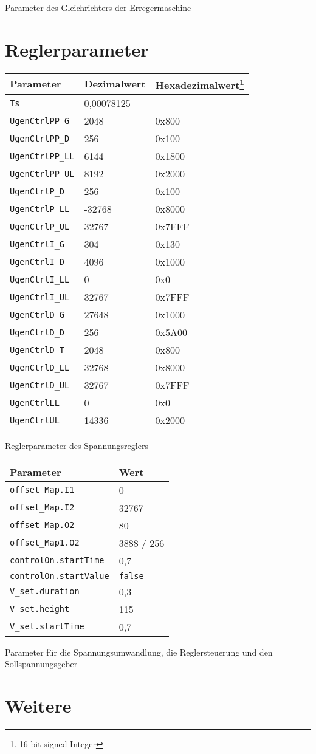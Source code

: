 Parameter des Gleichrichters der Erregermaschine

\hypertarget{reglerparameter}{%
\section{Reglerparameter}\label{reglerparameter}}

\begin{longtable}[]{@{}lll@{}}
\toprule
Parameter & Dezimalwert & Hexadezimalwert\footnote{16 bit signed Integer}\tabularnewline
\midrule
\endhead
\texttt{Ts} & 0,00078125 & -\tabularnewline
\texttt{UgenCtrlPP\_G} & 2048 & 0x800\tabularnewline
\texttt{UgenCtrlPP\_D} & 256 & 0x100\tabularnewline
\texttt{UgenCtrlPP\_LL} & 6144 & 0x1800\tabularnewline
\texttt{UgenCtrlPP\_UL} & 8192 & 0x2000\tabularnewline
\texttt{UgenCtrlP\_D} & 256 & 0x100\tabularnewline
\texttt{UgenCtrlP\_LL} & -32768 & 0x8000\tabularnewline
\texttt{UgenCtrlP\_UL} & 32767 & 0x7FFF\tabularnewline
\texttt{UgenCtrlI\_G} & 304 & 0x130\tabularnewline
\texttt{UgenCtrlI\_D} & 4096 & 0x1000\tabularnewline
\texttt{UgenCtrlI\_LL} & 0 & 0x0\tabularnewline
\texttt{UgenCtrlI\_UL} & 32767 & 0x7FFF\tabularnewline
\texttt{UgenCtrlD\_G} & 27648 & 0x1000\tabularnewline
\texttt{UgenCtrlD\_D} & 256 & 0x5A00\tabularnewline
\texttt{UgenCtrlD\_T} & 2048 & 0x800\tabularnewline
\texttt{UgenCtrlD\_LL} & 32768 & 0x8000\tabularnewline
\texttt{UgenCtrlD\_UL} & 32767 & 0x7FFF\tabularnewline
\texttt{UgenCtrlLL} & 0 & 0x0\tabularnewline
\texttt{UgenCtrlUL} & 14336 & 0x2000\tabularnewline
\bottomrule
\end{longtable}

Reglerparameter des Spannungsreglers

\begin{longtable}[]{@{}ll@{}}
\toprule
Parameter & Wert\tabularnewline
\midrule
\endhead
\texttt{offset\_Map.I1} & 0\tabularnewline
\texttt{offset\_Map.I2} & 32767\tabularnewline
\texttt{offset\_Map.O2} & 80\tabularnewline
\texttt{offset\_Map1.O2} & 3888 / 256\tabularnewline
\texttt{controlOn.startTime} & 0,7\tabularnewline
\texttt{controlOn.startValue} & \texttt{false}\tabularnewline
\texttt{V\_set.duration} & 0,3\tabularnewline
\texttt{V\_set.height} & 115\tabularnewline
\texttt{V\_set.startTime} & 0,7\tabularnewline
\bottomrule
\end{longtable}

Parameter für die Spannungsumwandlung, die Reglersteuerung und den
Sollspannungsgeber

\hypertarget{weitere}{%
\section{Weitere}\label{weitere}}

